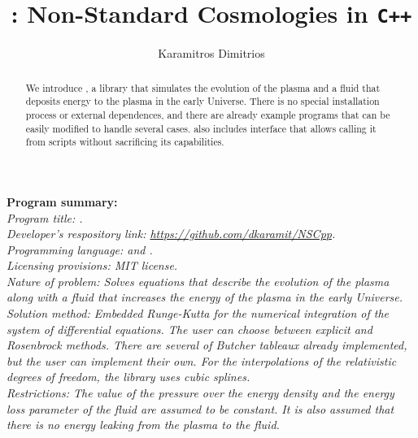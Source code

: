 \documentclass[11pt,a4paper]{article}
\author[ ]{Karamitros Dimitrios}
\affil[ ]{\em Department of Physics and Astronomy, The University of Manchester,}
\affil[ ]{\em Manchester M13 9PL, United Kingdom}
\affil[ ]{}
\affil[ ]{\textit{E-mail: } \href{mailto:dimitrios.karamitros@manchester.ac.uk}{\color{blue}{dimitrios.karamitros@manchester.ac.uk}}}
\title{\nsc: Non-Standard Cosmologies in {\tt C++}}
\begin{document}
\maketitle


\begin{abstract}
We introduce \nsc, a \CPP library that simulates the evolution of the plasma and a fluid that deposits energy to the plasma in the early Universe.
%
There is no special installation process or external dependences, and there are already example programs that can be easily modified to handle several cases. \nsc also includes \PY interface that allows calling it from \PY scripts without sacrificing its capabilities.
\end{abstract}

\noindent
{\bf Program summary:}\\

{\sl 
	Program title: \nsc.\\
	
	Developer's respository link: \href{https://github.com/dkaramit/NSCpp}{https://github.com/dkaramit/NSCpp}.\\
	
	Programming language: \CPP and \PY.\\
	
	Licensing provisions: MIT license.\\
	
	Nature of problem: Solves equations that describe the evolution of the plasma along with a fluid that increases the energy of the plasma in the early Universe.\\
	
	Solution method: Embedded Runge-Kutta for the numerical integration of the system of differential equations. The user can choose between explicit and Rosenbrock methods. There are several of Butcher tableaux already implemented, but the user can implement their own. For the interpolations of the relativistic degrees of freedom, the library uses cubic splines.\\ 
	
	Restrictions: The value of the pressure over the energy density and the energy loss parameter of the fluid are assumed to be constant. It is also assumed that there is no energy leaking from the plasma to the fluid.
}

\tableofcontents
\end{document}
